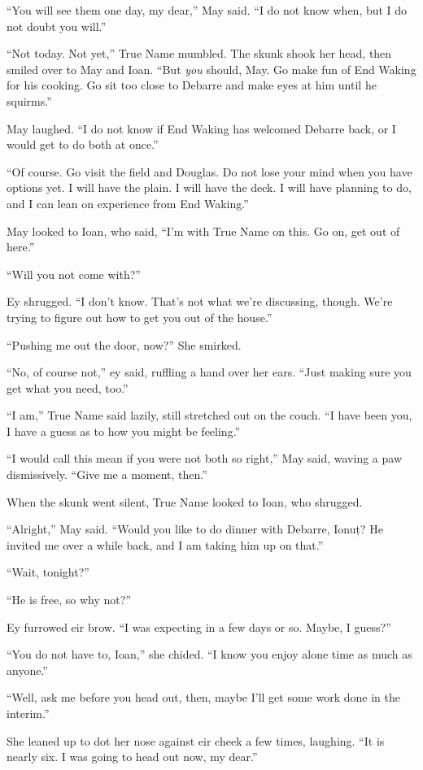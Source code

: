 ``You will see them one day, my dear,'' May said. ``I do not know when, but I do not doubt you will.''

``Not today. Not yet,'' True Name mumbled. The skunk shook her head, then smiled over to May and Ioan. ``But \emph{you} should, May. Go make fun of End Waking for his cooking. Go sit too close to Debarre and make eyes at him until he squirms.''

May laughed. ``I do not know if End Waking has welcomed Debarre back, or I would get to do both at once.''

``Of course. Go visit the field and Douglas. Do not lose your mind when you have options yet. I will have the plain. I will have the deck. I will have planning to do, and I can lean on experience from End Waking.''

May looked to Ioan, who said, ``I'm with True Name on this. Go on, get out of here.''

``Will you not come with?''

Ey shrugged. ``I don't know. That's not what we're discussing, though. We're trying to figure out how to get you out of the house.''

``Pushing me out the door, now?'' She smirked.

``No, of course not,'' ey said, ruffling a hand over her ears. ``Just making sure you get what you need, too.''

``I am,'' True Name said lazily, still stretched out on the couch. ``I have been you, I have a guess as to how you might be feeling.''

``I would call this mean if you were not both so right,'' May said, waving a paw dismissively. ``Give me a moment, then.''

When the skunk went silent, True Name looked to Ioan, who shrugged.

``Alright,'' May said. ``Would you like to do dinner with Debarre, Ionuț? He invited me over a while back, and I am taking him up on that.''

``Wait, tonight?''

``He is free, so why not?''

Ey furrowed eir brow. ``I was expecting in a few days or so. Maybe, I guess?''

``You do not have to, Ioan,'' she chided. ``I know you enjoy alone time as much as anyone.''

``Well, ask me before you head out, then, maybe I'll get some work done in the interim.''

She leaned up to dot her nose against eir cheek a few times, laughing. ``It is nearly six. I was going to head out now, my dear.''

